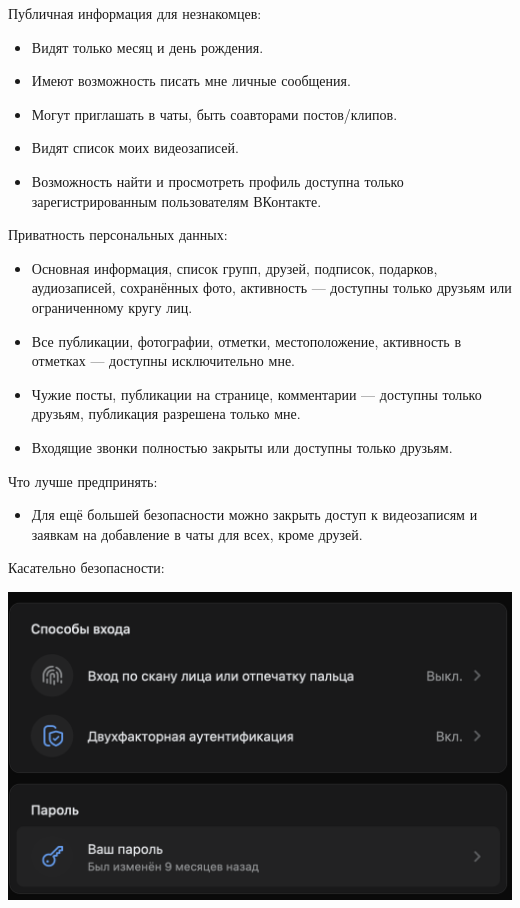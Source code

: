 \documentclass{article}
\begin{document}
Публичная информация для незнакомцев:

\begin{itemize}
    \item Видят только месяц и день рождения.
    \item Имеют возможность писать мне личные сообщения.
    \item Могут приглашать в чаты, быть соавторами постов/клипов.
    \item Видят список моих видеозаписей.
    \item Возможность найти и просмотреть профиль доступна только зарегистрированным пользователям ВКонтакте.
\end{itemize}

Приватность персональных данных:

\begin{itemize}
    \item Основная информация, список групп, друзей, подписок, подарков, аудиозаписей, сохранённых фото, активность — доступны только друзьям или ограниченному кругу лиц.
    \item Все публикации, фотографии, отметки, местоположение, активность в отметках — доступны исключительно мне.
    \item Чужие посты, публикации на странице, комментарии — доступны только друзьям, публикация разрешена только мне.
    \item Входящие звонки полностью закрыты или доступны только друзьям.
\end{itemize}

Что лучше предпринять:

\begin{itemize}
    \item Для ещё большей безопасности можно закрыть доступ к видеозаписям и заявкам на добавление в чаты для всех, кроме друзей.
\end{itemize}

Касательно безопасности:

\begin{center}
    \includegraphics[width=.9\textwidth]{10}
\end{center}
\end{document}
